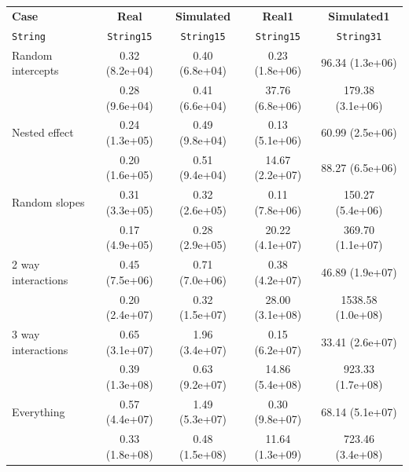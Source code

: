 \begin{tabular}{lcccc}
  \textbf{Case} & \textbf{Real} & \textbf{Simulated} & \textbf{Real1} & \textbf{Simulated1} \\
  \texttt{String} & \texttt{String15} & \texttt{String15} & \texttt{String15} & \texttt{String31} \\
  Random intercepts & 0.32 (8.2e+04) & 0.40 (6.8e+04) & 0.23 (1.8e+06) & 96.34 (1.3e+06) \\
   & 0.28 (9.6e+04) & 0.41 (6.6e+04) & 37.76 (6.8e+06) & 179.38 (3.1e+06) \\\hline
  Nested effect & 0.24 (1.3e+05) & 0.49 (9.8e+04) & 0.13 (5.1e+06) & 60.99 (2.5e+06) \\
   & 0.20 (1.6e+05) & 0.51 (9.4e+04) & 14.67 (2.2e+07) & 88.27 (6.5e+06) \\\hline
  Random slopes & 0.31 (3.3e+05) & 0.32 (2.6e+05) & 0.11 (7.8e+06) & 150.27 (5.4e+06) \\
   & 0.17 (4.9e+05) & 0.28 (2.9e+05) & 20.22 (4.1e+07) & 369.70 (1.1e+07) \\\hline
  2 way interactions & 0.45 (7.5e+06) & 0.71 (7.0e+06) & 0.38 (4.2e+07) & 46.89 (1.9e+07) \\
   & 0.20 (2.4e+07) & 0.32 (1.5e+07) & 28.00 (3.1e+08) & 1538.58 (1.0e+08) \\\hline
  3 way interactions & 0.65 (3.1e+07) & 1.96 (3.4e+07) & 0.15 (6.2e+07) & 33.41 (2.6e+07) \\
   & 0.39 (1.3e+08) & 0.63 (9.2e+07) & 14.86 (5.4e+08) & 923.33 (1.7e+08) \\\hline
  Everything & 0.57 (4.4e+07) & 1.49 (5.3e+07) & 0.30 (9.8e+07) & 68.14 (5.1e+07) \\
   & 0.33 (1.8e+08) & 0.48 (1.5e+08) & 11.64 (1.3e+09) & 723.46 (3.4e+08) \\
\end{tabular}
